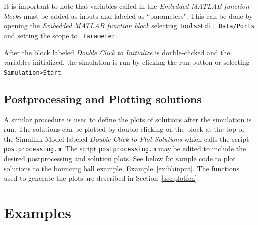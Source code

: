 \documentclass{article}
\begin{document}
\label{scr:initializationBB_inst}


It is important to note that variables called in the {\em Embedded MATLAB function blocks}
must be added as inputs and labeled as ``parameters". This can be done by opening the {\em Embedded MATLAB function block}
selecting {\tt Tools>Edit Data/Ports} and setting the scope to {\tt
Parameter}.

After the block labeled {\em Double Click to Initialize} is double-clicked and the variables initialized, the simulation is run by clicking the run button or selecting {\tt Simulation>Start}.


\subsection{Postprocessing and Plotting solutions}
\label{sec:postprocessing}

A similar procedure is used to define the plots of solutions after the simulation is run. The solutions can be plotted by double-clicking on the block at the top of the Simulink Model labeled {\em Double Click to Plot Solutions} which calls the script {\tt postprocessing.m}. The script {\tt postprocessing.m} may be edited to include the desired postprocessing and solution plots. See below for sample code to plot solutions to the bouncing ball example, Example~\ref{ex:bbinput}. The functions used to generate the plots are described in Section~\ref{sec:plotfcn}.\\

\label{scr:postprocesingBB_inst}



\section{Examples}
\label{sec:examples}
















\end{document}
